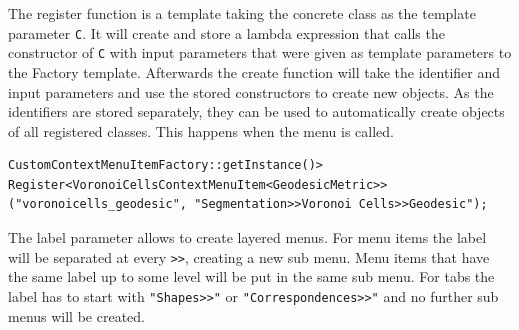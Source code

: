 The register function is a template taking the concrete class  as the template parameter \texttt{C}. It will create and store a lambda expression that calls the constructor of \texttt{C} with input parameters that were given as template parameters to the Factory template. Afterwards the create function will take the identifier and input parameters and use the stored constructors to create new objects. As the identifiers are stored separately, they can be used to automatically create objects of all registered classes. This happens when the menu is called.

\begin{lstlisting}[style=lstStyleCpp, numbers=none]
CustomContextMenuItemFactory::getInstance()>
Register<VoronoiCellsContextMenuItem<GeodesicMetric>>
("voronoicells_geodesic", "Segmentation>>Voronoi Cells>>Geodesic");
\end{lstlisting}

The label parameter allows to create layered menus. For menu items the label will be separated at every \texttt{>>}, creating a new sub menu. Menu items that have the same label up to some level will be put in the same sub menu. For tabs the label has to start with \texttt{"Shapes>>"} or \texttt{"Correspondences>>"} and no further sub menus will be created. 


